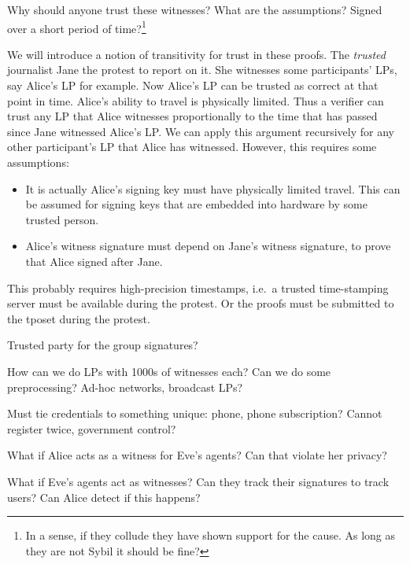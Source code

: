 \begin{question}
  Why should anyone trust these witnesses?
  What are the assumptions?
  Signed over a short period of time?\footnote{%
    In a sense, if they collude they have shown support for the cause.
    As long as they are not Sybil it should be fine?
  }
\end{question}

We will introduce a notion of transitivity for trust in these proofs.
The \emph{trusted} journalist Jane the protest to report on it.
She witnesses some participants' \acp{LP}, say Alice's \ac{LP} for example.
Now Alice's \ac{LP} can be trusted as correct at that point in time.
Alice's ability to travel is physically limited.
Thus a verifier can trust any \ac{LP} that Alice witnesses proportionally to 
the time that has passed since Jane witnessed Alice's \ac{LP}.
We can apply this argument recursively for any other participant's \ac{LP} that 
Alice has witnessed.
However, this requires some assumptions:
\begin{itemize}
  \item It is actually Alice's signing key must have physically limited travel.
    This can be assumed for signing keys that are embedded into hardware by 
    some trusted person.
  \item Alice's witness signature must depend on Jane's witness signature, to 
    prove that Alice signed after Jane.
\end{itemize}
\begin{remark}
  This probably requires high-precision timestamps, i.e.\ a trusted 
  time-stamping server must be available during the protest.
  Or the proofs must be submitted to the \ac{tposet} during the protest.
\end{remark}

\begin{question}
  Trusted party for the group signatures?
\end{question}
\begin{question}
  How can we do \acp{LP} with 1000s of witnesses each?
  Can we do some preprocessing?
  Ad-hoc networks, broadcast \acp{LP}?
\end{question}
\begin{question}
  Must tie credentials to something unique: phone, phone subscription?
  Cannot register twice, government control?
\end{question}

\begin{question}
  What if Alice acts as a witness for Eve's agents?
  Can that violate her privacy?
\end{question}
\begin{question}
  What if Eve's agents act as witnesses?
  Can they track their signatures to track users?
  Can Alice detect if this happens?
\end{question}

